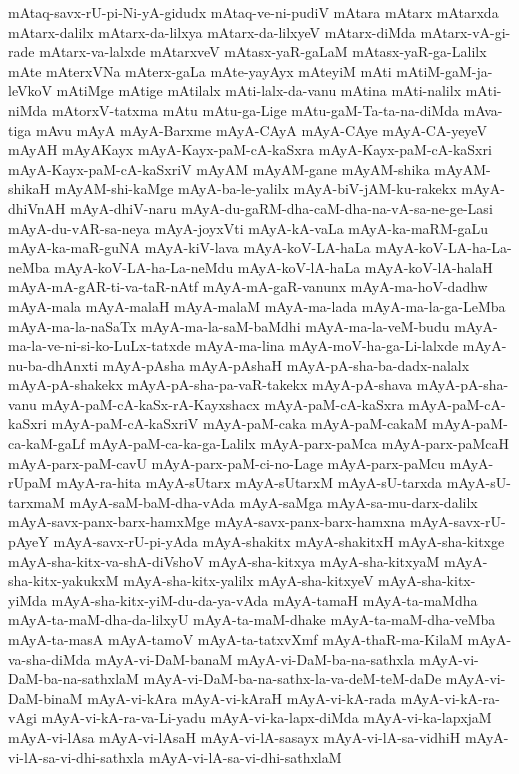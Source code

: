 {mAtaq-savx-rU-pi-Ni-yA-gidudx
mAtaq-ve-ni-pudiV
mAtara
mAtarx
mAtarxda
mAtarx-dalilx
mAtarx-da-lilxya
mAtarx-da-lilxyeV
mAtarx-diMda
mAtarx-vA-gi-rade
mAtarx-va-lalxde
mAtarxveV
mAtasx-yaR-gaLaM
mAtasx-yaR-ga-Lalilx
mAte
mAterxVNa
mAterx-gaLa
mAte-yayAyx
mAteyiM
mAti
mAtiM-gaM-ja-leVkoV
mAtiMge
mAtige
mAtilalx
mAti-lalx-da-vanu
mAtina
mAti-nalilx
mAti-niMda
mAtorxV-tatxma
mAtu
mAtu-ga-Lige
mAtu-gaM-Ta-ta-na-diMda
mAva-tiga
mAvu
mAyA
mAyA-Barxme
mAyA-CAyA
mAyA-CAye
mAyA-CA-yeyeV
mAyAH
mAyAKayx
mAyA-Kayx-paM-cA-kaSxra
mAyA-Kayx-paM-cA-kaSxri
mAyA-Kayx-paM-cA-kaSxriV
mAyAM
mAyAM-gane
mAyAM-shika
mAyAM-shikaH
mAyAM-shi-kaMge
mAyA-ba-le-yalilx
mAyA-biV-jAM-ku-rakekx
mAyA-dhiVnAH
mAyA-dhiV-naru
mAyA-du-gaRM-dha-caM-dha-na-vA-sa-ne-ge-Lasi
mAyA-du-vAR-sa-neya
mAyA-joyxVti
mAyA-kA-vaLa
mAyA-ka-maRM-gaLu
mAyA-ka-maR-guNA
mAyA-kiV-lava
mAyA-koV-LA-haLa
mAyA-koV-LA-ha-La-neMba
mAyA-koV-LA-ha-La-neMdu
mAyA-koV-lA-haLa
mAyA-koV-lA-halaH
mAyA-mA-gAR-ti-va-taR-nAtf
mAyA-mA-gaR-vanunx
mAyA-ma-hoV-dadhw
mAyA-mala
mAyA-malaH
mAyA-malaM
mAyA-ma-lada
mAyA-ma-la-ga-LeMba
mAyA-ma-la-naSaTx
mAyA-ma-la-saM-baMdhi
mAyA-ma-la-veM-budu
mAyA-ma-la-ve-ni-si-ko-LuLx-tatxde
mAyA-ma-lina
mAyA-moV-ha-ga-Li-lalxde
mAyA-nu-ba-dhAnxti
mAyA-pAsha
mAyA-pAshaH
mAyA-pA-sha-ba-dadx-nalalx
mAyA-pA-shakekx
mAyA-pA-sha-pa-vaR-takekx
mAyA-pA-shava
mAyA-pA-sha-vanu
mAyA-paM-cA-kaSx-rA-Kayxshacx
mAyA-paM-cA-kaSxra
mAyA-paM-cA-kaSxri
mAyA-paM-cA-kaSxriV
mAyA-paM-caka
mAyA-paM-cakaM
mAyA-paM-ca-kaM-gaLf
mAyA-paM-ca-ka-ga-Lalilx
mAyA-parx-paMca
mAyA-parx-paMcaH
mAyA-parx-paM-cavU
mAyA-parx-paM-ci-no-Lage
mAyA-parx-paMcu
mAyA-rUpaM
mAyA-ra-hita
mAyA-sUtarx
mAyA-sUtarxM
mAyA-sU-tarxda
mAyA-sU-tarxmaM
mAyA-saM-baM-dha-vAda
mAyA-saMga
mAyA-sa-mu-darx-dalilx
mAyA-savx-panx-barx-hamxMge
mAyA-savx-panx-barx-hamxna
mAyA-savx-rU-pAyeY
mAyA-savx-rU-pi-yAda
mAyA-shakitx
mAyA-shakitxH
mAyA-sha-kitxge
mAyA-sha-kitx-va-shA-diVshoV
mAyA-sha-kitxya
mAyA-sha-kitxyaM
mAyA-sha-kitx-yakukxM
mAyA-sha-kitx-yalilx
mAyA-sha-kitxyeV
mAyA-sha-kitx-yiMda
mAyA-sha-kitx-yiM-du-da-ya-vAda
mAyA-tamaH
mAyA-ta-maMdha
mAyA-ta-maM-dha-da-lilxyU
mAyA-ta-maM-dhake
mAyA-ta-maM-dha-veMba
mAyA-ta-masA
mAyA-tamoV
mAyA-ta-tatxvXmf
mAyA-thaR-ma-KilaM
mAyA-va-sha-diMda
mAyA-vi-DaM-banaM
mAyA-vi-DaM-ba-na-sathxla
mAyA-vi-DaM-ba-na-sathxlaM
mAyA-vi-DaM-ba-na-sathx-la-va-deM-teM-daDe
mAyA-vi-DaM-binaM
mAyA-vi-kAra
mAyA-vi-kAraH
mAyA-vi-kA-rada
mAyA-vi-kA-ra-vAgi
mAyA-vi-kA-ra-va-Li-yadu
mAyA-vi-ka-lapx-diMda
mAyA-vi-ka-lapxjaM
mAyA-vi-lAsa
mAyA-vi-lAsaH
mAyA-vi-lA-sasayx
mAyA-vi-lA-sa-vidhiH
mAyA-vi-lA-sa-vi-dhi-sathxla
mAyA-vi-lA-sa-vi-dhi-sathxlaM
}
